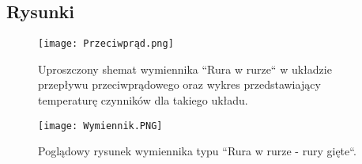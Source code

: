 \pagebreak
\subsection{Rysunki}
    \vspace{20px}
    \begin{figure}[ht]
        \centering
        \texttt{[image: Przeciwprąd.png]}
            \caption{Uproszczony shemat wymiennika ``Rura w rurze`` w układzie przepływu przeciwprądowego oraz wykres przedstawiający temperaturę czynników dla takiego układu.}
        \centering
        \texttt{[image: Wymiennik.PNG]}
            \caption{Poglądowy rysunek wymiennika typu ``Rura w rurze - rury gięte``. }
    \end{figure}

